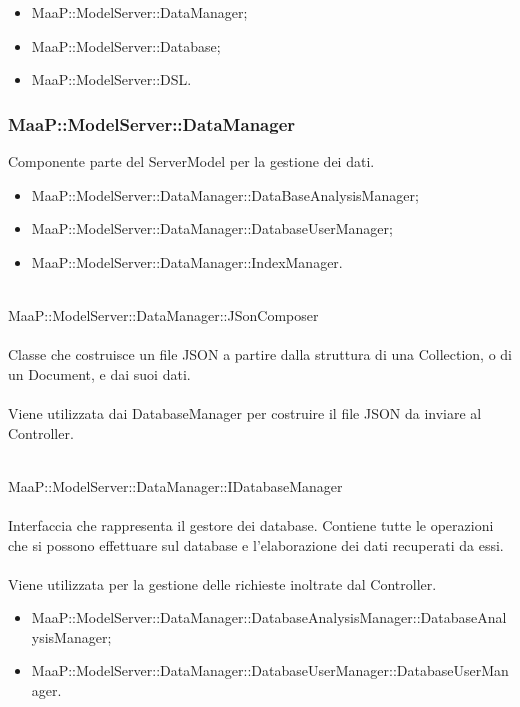 \begin{itemize}
\item MaaP::ModelServer::DataManager;
\item MaaP::ModelServer::Database;
\item MaaP::ModelServer::DSL.
\end{itemize}

\subsubsection{MaaP::ModelServer::DataManager}
Componente parte del ServerModel per la gestione dei dati.
\begin{itemize}
\item MaaP::ModelServer::DataManager::DataBaseAnalysisManager;
\item MaaP::ModelServer::DataManager::DatabaseUserManager;
\item MaaP::ModelServer::DataManager::IndexManager.
\end{itemize}

	\\
	MaaP::ModelServer::DataManager::JSonComposer\\
	\\
	Classe che costruisce un file JSON a partire dalla struttura di una Collection, o di un Document, e dai suoi dati.\\
	\\
	Viene utilizzata dai DatabaseManager per costruire il file JSON da inviare al Controller.

	\\
	MaaP::ModelServer::DataManager::IDatabaseManager\\
	\\
	Interfaccia che rappresenta il gestore dei database. Contiene tutte le operazioni che si possono effettuare sul database e l'elaborazione dei dati recuperati da essi.\\
	\\
	Viene utilizzata per la gestione delle richieste inoltrate dal Controller.\\
	\begin{itemize}
	\item MaaP::ModelServer::DataManager::DatabaseAnalysisManager::DatabaseAnalysisManager;
	\item MaaP::ModelServer::DataManager::DatabaseUserManager::DatabaseUserManager.	
	\end{itemize}

